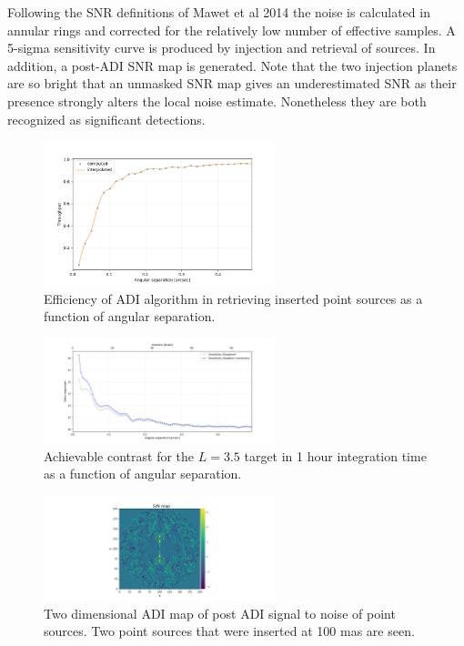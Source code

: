 Following the SNR definitions of Mawet et al 2014 the noise is calculated in annular rings and corrected for the relatively low number of effective samples. A 5-sigma sensitivity curve is produced by injection and retrieval of sources. In addition, a post-ADI SNR map is generated. Note that the two injection planets are so bright that an unmasked SNR map gives an underestimated SNR as their presence strongly alters the local noise estimate. Nonetheless they are both recognized as significant detections.

\begin{figure}[!ht]
  \centering
  \includegraphics[width=0.6\textwidth]{./figures/adi_throughput.png}
  \caption{Efficiency of ADI algorithm in retrieving inserted point sources as a function of angular separation.}
\end{figure}

\begin{figure}[!ht]
  \centering
  \includegraphics[width=0.6\textwidth]{./figures/adi_contrast.png}
  \caption{Achievable contrast for the $L=3.5$ target in 1 hour integration time as a function of angular separation.}
\end{figure}

\begin{figure}[!ht]
  \centering
  \includegraphics[width=0.6\textwidth]{./figures/adi_snrmap.png}
  \caption{Two dimensional ADI map of post ADI signal to noise of point sources. Two point sources that were inserted at 100 mas are seen.}
\end{figure}

